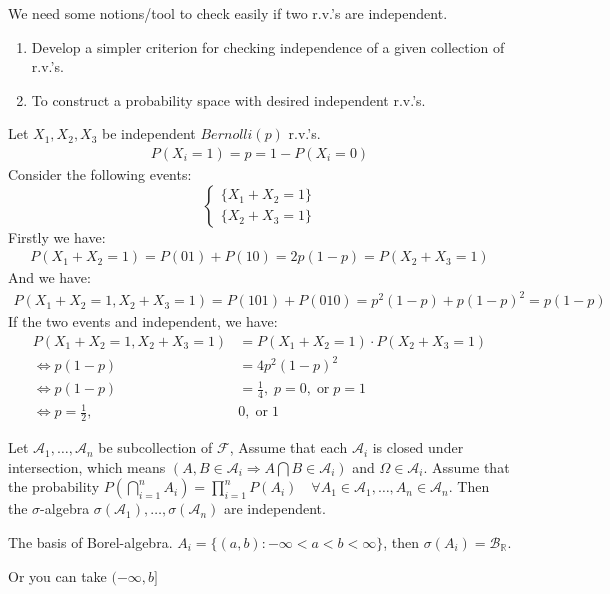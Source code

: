 \documentclass[11pt]{article}
\begin{document}
We need some notions/tool to check easily if two r.v.'s are independent.
\begin{enumerate}
    \item Develop a simpler criterion for checking independence of a given collection of r.v.'s.
    \item To construct a probability space with desired independent r.v.'s.
\end{enumerate}

\begin{example}
    Let $X_1, X_2,X_3$ be independent $Bernolli(p)$ r.v.'s.
    \begin{align*}
        P(X_{i} = 1) = p = 1-P(X_{i} = 0)
    \end{align*}
    Consider the following events:
    \begin{equation*}
        \begin{cases} 
        \{X_1 + X_2 = 1\}\\ 
        \{X_2+X_3 = 1 \}  
        \end{cases}
    \end{equation*}
    Firstly we have:
    \begin{align*}
        P(X_1 + X_2 = 1) = P(01) + P(10) = 2p(1-p) = P(X_2+X_3 = 1)
    \end{align*}
    And we have:
    \begin{align*}
        P(X_1+X_2=1, X_2+X_3=1) = P(101) + P(010) = p^{2}(1-p) + p(1-p)^2 = p(1-p)
    \end{align*}
    If the two events and independent, we have:
    \begin{align*}
        P(X_1+X_2=1, X_2+X_3=1) &= P(X_1 + X_2 = 1) \cdot P(X_2+X_3 = 1)\\
        \iff p(1-p) &= 4p^{2}(1-p)^{2} \\
        \iff p(1-p) &= \frac{1}{4}, \; p =0,\; \text{or} \; p=1 \\
        \iff p = \frac{1}{2},\; &0,\; \text{or} \; 1
    \end{align*}
\end{example}


\begin{theorem}
    \label{theorem:1.3}
    Let $\mathcal{A}_{1}, \ldots ,\mathcal{A}_{n}$ be subcollection of $\mathcal{F}$,
    Assume that each $\mathcal{A}_{i}$ is closed under intersection, which means 
    $(A,B \in \mathcal{A}_{i} \Longrightarrow A \bigcap B \in \mathcal{A}_{i})$ and $\Omega \in \mathcal{A}_{i}$.
    Assume that the probability $P(\bigcap_{i=1}^{n} A_{i}) = \prod_{i=1}^{n}P(A_i) \quad
    \forall A_1 \in \mathcal{A}_{1}, \ldots ,A_n \in \mathcal{A}_{n}$. Then the $\sigma$-algebra 
    $\sigma(\mathcal{A}_{1}), \ldots ,\sigma(\mathcal{A}_{n})$ are independent.
\end{theorem}
\begin{example}
    The basis of Borel-algebra.
    $A_i = \{(a,b): -\infty < a < b <\infty\}$, then $\sigma(A_{i}) = \mathcal{B}_{\mathbb{R}}$.

    Or you can take $(-\infty, b]$
\end{example}
\end{document}
